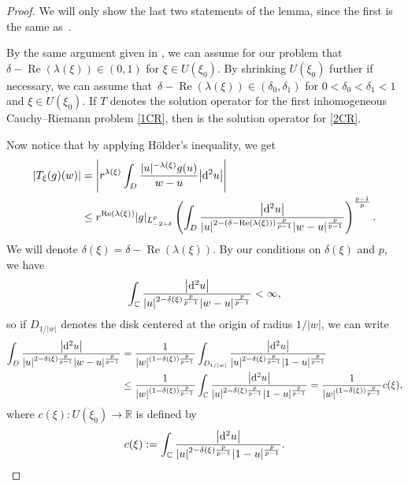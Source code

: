 \begin{proof}
We will only show the last two statements of the lemma, since the first is the same as~\cite[Lemma 7.2]{BB04}.

By the same argument given in \cite[Lemma 7.2]{BB04}, we can assume for our problem that $\delta -\operatorname{Re}(\lambda(\xi))\in (0,1)$ for $\xi \in U(\xi_0)$. By shrinking $U(\xi_0)$ further if necessary, we can assume that~${\delta -\operatorname{Re}(\lambda(\xi))\in (\delta_0,\delta_1)}$ for $0<\delta_0<\delta_1<1$ and $\xi \in U(\xi_0)$. If $T$ denotes the solution operator for the first inhomogeneous Cauchy--Riemann problem \eqref{1CR}, then  is the solution operator for \eqref{2CR}.

Now notice that by applying H\"{o}lder's inequality, we get
\begin{align}
 |T_{\xi}(g)(w)|&=\Biggl|r^{\lambda(\xi)}\int_{D}\frac{|u|^{-\lambda(\xi)}g(u)}{w-u}\big|{\rm d}^2u\big|\Biggr|\nonumber\\
 &\leq r^{\operatorname{Re}(\lambda(\xi))}|g|_{L^p_{-2+\delta}}\left(\int_D \frac{\big|{\rm d}^2u\big|}{|u|^{2-(\delta -\operatorname{Re}(\lambda(\xi)))\frac{p}{p-1}}|w-u|^{\frac{p}{p-1}}}\right)^{\frac{p-1}{p}}.\label{B7}
\end{align}
We will denote $\delta(\xi)=\delta - \operatorname{Re}(\lambda(\xi))$. By our conditions on $\delta(\xi)$ and $p$, we have
\begin{equation*}
\int_{\mathbb{C}} \frac{\big|{\rm d}^2u\big|}{|u|^{2-\delta(\xi)\frac{p}{p-1}}|w-u|^{\frac{p}{p-1}}}<\infty,
\end{equation*}
so if $D_{1/|w|}$ denotes the disk centered at the origin of radius $1/|w|$, we can write
\begin{align*}
\int_D \frac{\big|{\rm d}^2u\big|}{|u|^{2-\delta(\xi)\frac{p}{p-1}}|w-u|^{\frac{p}{p-1}}}&=\frac{1}{|w|^{(1-\delta(\xi))\frac{p}{p-1}}}\int_{D_{1/|w|}}\frac{\big|{\rm d}^2u\big|}{|u|^{2-\delta(\xi)\frac{p}{p-1}}|1-u|^{\frac{p}{p-1}}}\\
&\leq \frac{1}{|w|^{(1-\delta(\xi))\frac{p}{p-1}}}\int_{\mathbb{C}}\frac{\big|{\rm d}^2u\big|}{|u|^{2-\delta(\xi)\frac{p}{p-1}}|1-u|^{\frac{p}{p-1}}}
=\frac{1}{|w|^{(1-\delta(\xi))\frac{p}{p-1}}} c(\xi),
\end{align*}
where $c(\xi)\colon U(\xi_0) \to \mathbb{R}$ is defined by
\begin{equation*}
 c(\xi):=\int_{\mathbb{C}}\frac{\big|{\rm d}^2u\big|}{|u|^{2-\delta(\xi)\frac{p}{p-1}}|1-u|^{\frac{p}{p-1}}}.
\end{equation*}


\end{proof}
